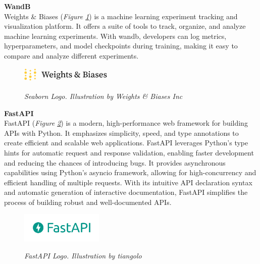 \vspace{0.5cm}
\textbf{WandB} \\

Weights \& Biases (\textit{Figure \ref{fig:wandb-logo}}) is a machine learning experiment tracking and visualization platform. It offers a suite of tools to track, organize, and analyze machine learning experiments. With wandb, developers can log metrics, hyperparameters, and model checkpoints during training, making it easy to compare and analyze different experiments.

\begin{figure}[H]
\centering
\includegraphics[width=0.4\textwidth]{imatges/studies_and_decisions/wandb-logo.png}
\caption[Seaborn Logo]{\textit{Seaborn Logo. Illustration by Weights \& Biases Inc}}
{\label{fig:wandb-logo}}
\end{figure}

\vspace{0.5cm}
\textbf{FastAPI} \\

FastAPI (\textit{Figure \ref{fig:fastapi-logo}}) is a modern, high-performance web framework for building APIs with Python. It emphasizes simplicity, speed, and type annotations to create efficient and scalable web applications. FastAPI leverages Python's type hints for automatic request and response validation, enabling faster development and reducing the chances of introducing bugs. It provides asynchronous capabilities using Python's asyncio framework, allowing for high-concurrency and efficient handling of multiple requests. With its intuitive API declaration syntax and automatic generation of interactive documentation, FastAPI simplifies the process of building robust and well-documented APIs. 

\begin{figure}[H]
\centering
\begin{adjustbox}{trim=0cm 0.25cm, clip}
\includegraphics[width=0.35\textwidth]{imatges/studies_and_decisions/fastapi-logo.png}
\end{adjustbox}
\caption[FastAPI Logo]{\textit{FastAPI Logo. Illustration by tiangolo}}
{\label{fig:fastapi-logo}}
\end{figure}


